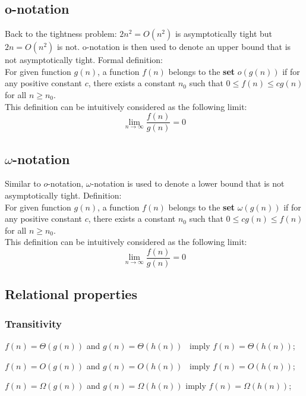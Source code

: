 \documentclass{article}
\begin{document}
\subsection*{o-notation}
Back to the tightness problem: $2n^2 = O(n^2)$ is asymptotically tight but $2n = O(n^2)$ is not. o-notation is then used to
denote an upper bound that is not asymptotically tight. Formal definition: \\

For given function $g(n)$, a function $f(n)$ belongs to the \textbf{set} $o(g(n))$ if for any positive constant $c$, there exists a constant $n_0$ such that $0 \leq f(n) \leq cg(n)$ for all $n \geq n_0$.\\
This definition can be intuitively considered as the following limit: \[\lim_{n\to\infty}{\frac{f(n)}{g(n)}} = 0\] %

\subsection*{$\omega$-notation}

Similar to $o$-notation, $\omega$-notation is used to denote a lower bound that is not asymptotically tight. Definition:\\

For given function $g(n)$, a function $f(n)$ belongs to the \textbf{set} $\omega(g(n))$ if for any positive constant $c$, there exists a constant $n_0$ such that $0 \leq cg(n) \leq f(n)$ for all $n \geq n_0$.\\
This definition can be intuitively considered as the following limit: \[\lim_{n\to\infty}{\frac{f(n)}{g(n)}} = 0\]

\subsection*{Relational properties}
\subsubsection*{Transitivity}

\hspace{3cm} $f(n) = \Theta(g(n))$ and $g(n) =\Theta(h(n))$ \, imply $f(n) = \Theta(h(n))$;

\hspace{3cm} $f(n) = O(g(n))$ and $g(n) =O(h(n))$  \, imply $f(n) = O(h(n))$;

\hspace{3cm} $f(n) = \Omega(g(n))$ and $g(n) =\Omega(h(n))$  \hspace{1.2mm} imply $f(n) = \Omega(h(n))$;
\end{document}
